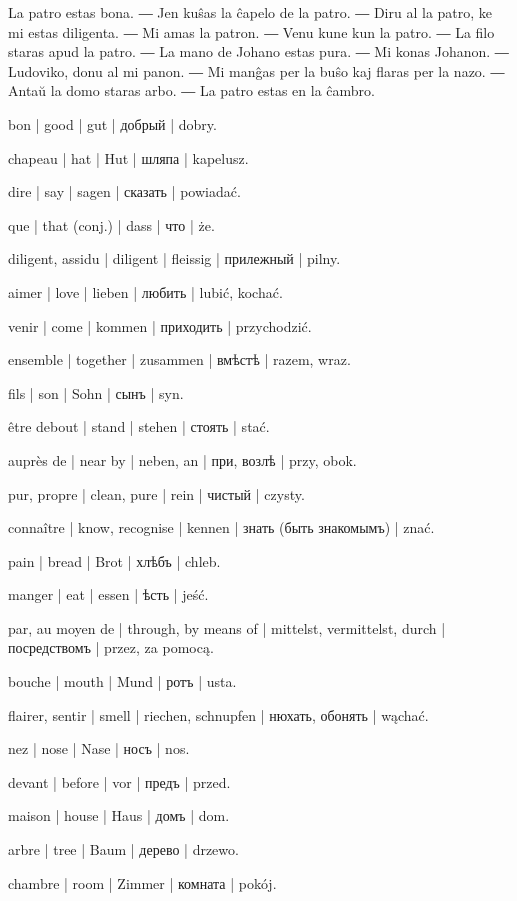 \begin{samepage}

La patro estas bona. ― Jen kuŝas la ĉapelo de la patro. ― Diru al la patro, ke mi estas diligenta. ― Mi amas la patron. ― Venu kune kun la patro. ― La filo staras apud la patro. ― La mano de Johano estas pura. ― Mi konas Johanon. ― Ludoviko, donu al mi panon. ― Mi manĝas per la buŝo kaj flaras per la nazo. ― Antaŭ la domo staras arbo. ― La patro estas en la ĉambro.
\end{samepage}

\begin{ekzvocab}{1em}
 bon | good | gut | добрый | dobry.

 chapeau | hat | Hut | шляпа | kapelusz.

 dire | say | sagen | сказать | powiadać.

 que | that (conj.) | dass | что | że.

 diligent, assidu | diligent | fleissig | прилежный | pilny.

 aimer | love | lieben | любить | lubić, kochać.

 venir | come | kommen | приходить | przychodzić.

 ensemble | together | zusammen | вмѣстѣ | razem, wraz.

 fils | son | Sohn | сынъ | syn.

 être debout | stand | stehen | стоять | stać.

 auprès de | near by | neben, an | при, возлѣ | przy, obok.

 pur, propre | clean, pure | rein | чистый | czysty.

 connaître | know, recognise | kennen | знать (быть знакомымъ) | znać.

 pain | bread | Brot | хлѣбъ | chleb.

 manger | eat | essen | ѣсть | jeść.

 par, au moyen de | through, by means of | mittelst, vermittelst, durch | посредствомъ | przez, za pomocą.

 bouche | mouth | Mund | ротъ | usta.

 flairer, sentir | smell | riechen, schnupfen | нюхать, обонять | wąchać.

 nez | nose | Nase | носъ | nos.

 devant | before | vor | предъ | przed.

 maison | house | Haus | домъ | dom.

 arbre | tree | Baum | дерево | drzewo.

 chambre | room | Zimmer | комната | pokój.

\end{ekzvocab}

